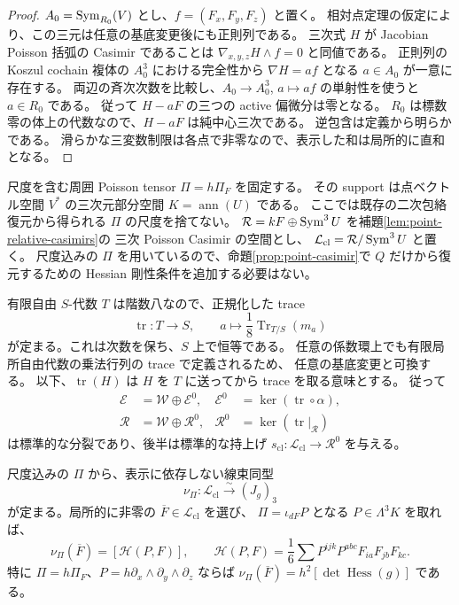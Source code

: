 \begin{proof}
$A_0=\operatorname{Sym}_{R_0}(V)$ とし、$f=(F_x,F_y,F_z)$ と置く。
相対点定理の仮定により、この三元は任意の基底変更後にも正則列である。
三次式 $H$ が Jacobian Poisson 括弧の Casimir であることは
$\nabla_{x,y,z}H\wedge f=0$ と同値である。
正則列の Koszul cochain 複体の $A_0^3$ における完全性から
$\nabla H=a f$ となる $a\in A_0$ が一意に存在する。
両辺の斉次次数を比較し、$A_0\to A_0^3$, $a\mapsto af$ の単射性を使うと
$a\in R_0$ である。
従って $H-aF$ の三つの active 偏微分は零となる。
$R_0$ は標数零の体上の代数なので、$H-aF$ は純中心三次である。
逆包含は定義から明らかである。
滑らかな三変数制限は各点で非零なので、表示した和は局所的に直和となる。
\end{proof}

尺度を含む周囲 Poisson tensor $\Pi=h\Pi_F$ を固定する。
その support は点ベクトル空間 $V^*$ の三次元部分空間
$K=\operatorname{ann}(U)$ である。
ここでは既存の二次包絡復元から得られる $\Pi$ の尺度を捨てない。
$\mathcal R=kF\oplus\operatorname{Sym}^3U$ を補題\ref{lem:point-relative-casimirs}の
三次 Poisson Casimir の空間とし、
$\mathcal L_{\mathrm{cl}}=\mathcal R/\operatorname{Sym}^3U$ と置く。
尺度込みの $\Pi$ を用いているので、命題\ref{prop:point-casimir}で
$Q$ だけから復元するための Hessian 剛性条件を追加する必要はない。

有限自由 $S$-代数 $T$ は階数八なので、正規化した trace
\begin{equation}\label{eq:point-normalized-trace}
 \operatorname{tr}:T\longrightarrow S,
 \qquad a\longmapsto\frac18\operatorname{Tr}_{T/S}(m_a)
\end{equation}
が定まる。これは次数を保ち、$S$ 上で恒等である。
任意の係数環上でも有限局所自由代数の乗法行列の trace で定義されるため、
任意の基底変更と可換する。
以下、$\operatorname{tr}(H)$ は $H$ を $T$ に送ってから trace を取る意味とする。
従って
\begin{equation}\label{eq:point-trace-splittings}
 \begin{aligned}
 \mathcal E&=\mathcal W\oplus\mathcal E^0,
 &\mathcal E^0&=\ker(\operatorname{tr}\circ\alpha),\\
 \mathcal R&=\mathcal W\oplus\mathcal R^0,
 &\mathcal R^0&=\ker(\operatorname{tr}|_{\mathcal R})
 \end{aligned}
\end{equation}
は標準的な分裂であり、後半は標準的な持上げ
$s_{\mathrm{cl}}:\mathcal L_{\mathrm{cl}}\to\mathcal R^0$ を与える。

\begin{lemma}\label{lem:point-hessian-line}
尺度込みの $\Pi$ から、表示に依存しない線束同型
\begin{equation}\label{eq:point-hessian-line}
 \nu_\Pi:\mathcal L_{\mathrm{cl}}\xrightarrow{\sim}(J_g)_3
\end{equation}
が定まる。局所的に非零の $\overline F\in\mathcal L_{\mathrm{cl}}$ を選び、
$\Pi=\iota_{dF}P$ となる $P\in\Lambda^3K$ を取れば、
\[
 \nu_\Pi(\overline F)=
 \left[\mathscr H(P,F)\right],\qquad
 \mathscr H(P,F)=\frac16\sum P^{ijk}P^{abc}F_{ia}F_{jb}F_{kc}.
\]
特に $\Pi=h\Pi_F$、$P=h\partial_x\wedge\partial_y\wedge\partial_z$ ならば
$\nu_\Pi(\overline F)=h^2[\det\operatorname{Hess}(g)]$ である。
\end{lemma}

